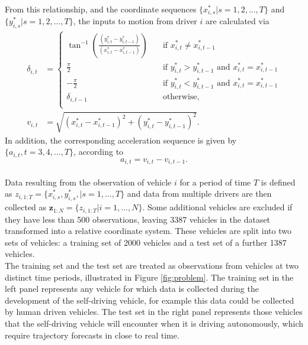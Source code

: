 \documentclass[12pt,a4paper]{article}\usepackage[]{graphicx}\usepackage[]{color}
\begin{document}
From this relationship, and the coordinate sequences $\{x^*_{i, s} | s=1,2,...,T\}$ and $\{y^*_{i, s} | s=1,2,...,T\}$, the inputs to motion from driver $i$ are calculated via
\begin{align}
\delta_{i, t} &= 
     \begin{cases}
       \tan^{-1}\left(\frac{(y^*_{i, t} - y^*_{i, t-1})}{(x^*_{i, t} - x^*_{i, t-1})} \right)  &\quad\text{if }x^*_{i, t} \neq x^*_{i, t-1} \\
       \frac{\pi}{2} &\quad\text{if } y^*_{i, t} > y^*_{i, t-1} \mbox{ and } x^*_{i, t} = x^*_{i, t-1} \\
       -\frac{\pi}{2} &\quad\text{if } y^*_{i, t} < y^*_{i, t-1} \mbox{ and } x^*_{i, t} = x^*_{i, t-1} \\
       \delta_{i, t-1} &\quad\text{otherwise,} \\ 
     \end{cases} \label{dEq} \\
v_{i, t} &= \sqrt{(x^*_{i, t} - x^*_{i, t-1})^2 + (y^*_{i, t} - y^*_{i, t-1})^2} \label{vEq}.
\end{align}
In addition, the corresponding acceleration sequence is given by $\{a_{i, t},t=3,4,...,T\}$, according to
\begin{equation}
\label{aEq}
a_{i, t} = v_{i, t} - v_{i, t-1}. 
\end{equation}
\\

Data resulting from the observation of vehicle $i$ for a period of time $T$ is defined as $z_{i, 1:T} = \{x^*_{i, s}, y^*_{i, s}, | s = 1, \dots, T\}$ and data from multiple drivers are then collected as $\mathbf{z}_{1:N} = \{z_{i, 1:T} | i = 1, \dots, N\}$. Some additional vehicles are excluded if they have less than 500 observations, leaving 3387 vehicles in the dataset transformed into a relative coordinate system. These vehicles are split into two sets of vehicles: a training set of 2000 vehicles and a test set of a further 1387 vehicles.
\\

The training set and the test set are treated as observations from vehicles at two distinct time periods, illustrated in Figure \ref{fig:problem}. The training set in the left panel represents any vehicle for which data is collected during the development of the self-driving vehicle, for example this data could be collected by human driven vehicles. The test set in the right panel represents those vehicles that the self-driving vehicle will encounter when it is driving autonomously, which require trajectory forecasts in close to real time.
\end{document}
